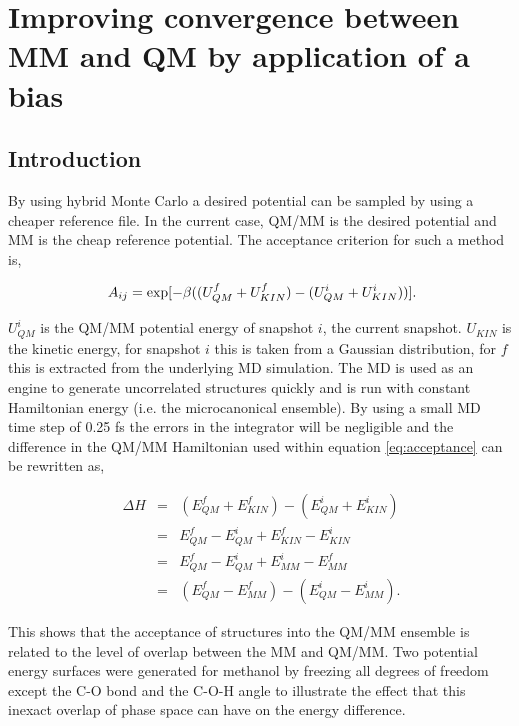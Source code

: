 \chapter{Improving convergence between MM and QM by application of a bias} \label{Chapter:biasing_potentials}

\section{Introduction}

By using hybrid Monte Carlo \cite{hybrid_mc} a desired potential can be sampled by using a cheaper reference file.  In the current case, QM/MM is the desired potential and MM is the cheap reference potential.  The acceptance criterion for such a method is,

\begin{equation} \label{eq:acceptance}
\ A_{ij}= \exp [ - \beta (( U_{QM}^f + U_{KIN}^f ) - (U_{QM}^i + U_{KIN}^i))] \\.
\end{equation}

$U_{QM}^i$ is the QM/MM potential energy of snapshot $i$, the current snapshot.  $U_{KIN}$ is the kinetic energy, for snapshot $i$ this is taken from a Gaussian distribution, for $f$ this is extracted from the underlying MD simulation.  The MD is used as an engine to generate uncorrelated structures quickly and is run with constant Hamiltonian energy (i.e. the microcanonical ensemble).  By using a small MD time step of 0.25 fs the errors in the integrator will be negligible and the difference in the QM/MM Hamiltonian used within equation \ref{eq:acceptance} can be rewritten as,


\begin{eqnarray}
\ \Delta H &=& (E_{QM}^f+E_{KIN}^f) - (E_{QM}^i+E_{KIN}^i) \\
\ &=& E_{QM}^f - E_{QM}^i + E_{KIN}^f - E_{KIN}^i \\
\ &=& E_{QM}^f - E_{QM}^i + E_{MM}^i - E_{MM}^f \\
\ &=& (E_{QM}^f - E_{MM}^f) - (E_{QM}^i - E_{MM}^i) .
\end{eqnarray}

This shows that the acceptance of structures into the QM/MM ensemble is related to the level of overlap between the MM and QM/MM.  Two potential energy surfaces were generated for methanol by freezing all degrees of freedom except the C-O bond and the C-O-H angle to illustrate the effect that this inexact overlap of phase space can have on the energy difference.

